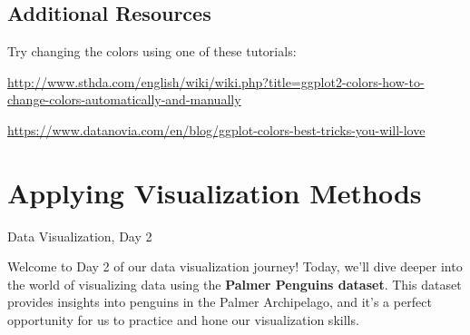 \documentclass[
  letterpaper,
  DIV=11,
  numbers=noendperiod]{scrreprt}
\begin{document}
\hypertarget{additional-resources}{%
\section{Additional Resources}\label{additional-resources}}

Try changing the colors using one of these tutorials:

\url{http://www.sthda.com/english/wiki/wiki.php?title=ggplot2-colors-how-to-change-colors-automatically-and-manually}

\href{https://www.datanovia.com/en/blog/ggplot-colors-best-tricks-you-will-love/\#:~:text=Change\%20ggplot\%20colors\%20by\%20assigning,or\%20to\%20the\%20fill\%20arguments.}{https://www.datanovia.com/en/blog/ggplot-colors-best-tricks-you-will-love}


\hypertarget{applying-visualization-methods}{%
\chapter{Applying Visualization
Methods}\label{applying-visualization-methods}}

Data Visualization, Day 2

\hfill\break

Welcome to Day 2 of our data visualization journey! Today, we'll dive
deeper into the world of visualizing data using the \textbf{Palmer
Penguins dataset}. This dataset provides insights into penguins in the
Palmer Archipelago, and it's a perfect opportunity for us to practice
and hone our visualization skills.
\end{document}
